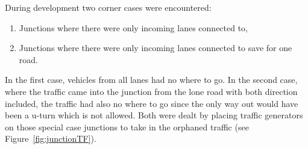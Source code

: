 During development two corner cases were encountered:
\begin{enumerate}
	\item Junctions where there were only incoming lanes connected to,
	\item Junctions where there were only incoming lanes connected to save for one road.
\end{enumerate}

In the first case, vehicles from all lanes had no where to go. In the second case, where the traffic came into the junction from the lone road with both direction included, the traffic had also no where to go since the only way out would have been a u-turn which is not allowed.
Both were dealt by placing traffic generators on those special case junctions to take in the orphaned traffic (see Figure~\ref{fig:junctionTF}).

